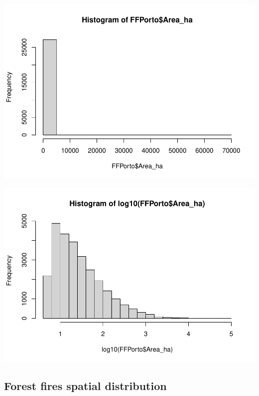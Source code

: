 \documentclass[
]{book}
\newenvironment{Shaded}{\begin{snugshade}}{\end{snugshade}}
\newcommand{\FunctionTok}[1]{\textcolor[rgb]{0.13,0.29,0.53}{\textbf{#1}}}
\newcommand{\NormalTok}[1]{#1}
\newcommand{\SpecialCharTok}[1]{\textcolor[rgb]{0.81,0.36,0.00}{\textbf{#1}}}
\begin{document}
\includegraphics{02-GWSS_files/figure-latex/histo_FF-1.pdf}

\begin{Shaded}
\end{Shaded}

\includegraphics{02-GWSS_files/figure-latex/histo_FF-2.pdf}

\hypertarget{forest-fires-spatial-distribution}{%
\subsection{Forest fires spatial distribution}\label{forest-fires-spatial-distribution}}
\end{document}
